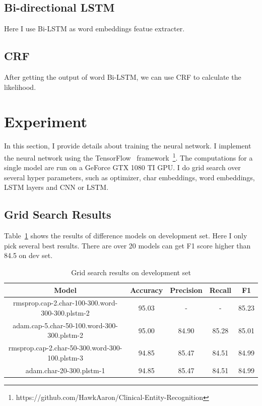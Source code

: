 \documentclass{article}
\begin{document}
\subsection{Bi-directional LSTM}
Here I use Bi-LSTM as word embeddings featue extracter.

\subsection{CRF}
After getting the output of word Bi-LSTM, we can use CRF to calculate the likelihood.

\section{Experiment}
In this section, I provide details about training the neural network. I implement the neural network using the TensorFlow~\cite{tf} framework~\footnote{https://github.com/HawkAaron/Clinical-Entity-Recognition}.
The computations for a single model are run on a GeForce GTX 1080 TI GPU.
I do grid search over several hyper parameters, such as optimizer, char embeddings, word embeddings, LSTM layers and CNN or LSTM.

\subsection{Grid Search Results}

Table~\ref{tab:grid} shows the results of difference models on development set. Here I only pick several best results.
There are over 20 models can get F1 score higher than 84.5 on dev set.
\begin{table}[tbh]
    \caption{Grid search results on development set}
    \label{tab:grid}
    \centering
    \begin{tabular}{c | c | c | c | c}
        \hline
        Model & Accuracy & Precision & Recall & F1 \\
        \hline
        rmsprop.cap-2.char-100-300.word-300-300.plstm-2 & 95.03 & - & - & 85.23 \\
        \hline
        adam.cap-5.char-50-100.word-300-300.plstm-2 & 95.00 & 84.90 & 85.28 & 85.01 \\
        \hline
        rmsprop.cap-2.char-50-300.word-300-100.plstm-3 & 94.85 & 85.47 & 84.51 & 84.99 \\
        \hline
        adam.char-20-300.plstm-1 & 94.85 & 85.47 & 84.51 & 84.99 \\
        \hline
    \end{tabular}
\end{table}
\end{document}
